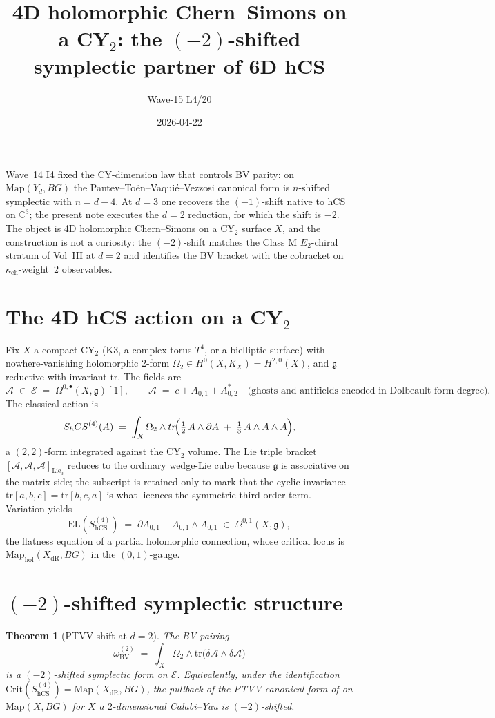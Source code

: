 \documentclass[11pt]{amsart}
\title{4D holomorphic Chern--Simons on a CY$_2$: the $(-2)$-shifted
symplectic partner of 6D hCS}
\author{Wave-15 L4/20}
\date{2026-04-22}
\providecommand{\C}{\mathbb{C}}
\providecommand{\cA}{\mathcal{A}}
\providecommand{\cE}{\mathcal{E}}
\providecommand{\dbar}{\bar{\partial}}
\providecommand{\g}{\mathfrak{g}}
\providecommand{\tr}{\mathrm{tr}}
\providecommand{\BV}{\mathrm{BV}}
\providecommand{\hCS}{\mathrm{hCS}}
\providecommand{\kappach}{\kappa_{\mathrm{ch}}}
\providecommand{\Map}{\mathrm{Map}}
\providecommand{\Crit}{\mathrm{Crit}}
\theoremstyle{plain}
\newtheorem{theorem}{Theorem}[section]
\theoremstyle{definition}
\begin{document}
\maketitle

Wave~14 I4 fixed the CY-dimension law that controls BV parity: on
$\mathrm{Map}(Y_d, BG)$ the Pantev--To\"en--Vaqui\'e--Vezzosi canonical
form is $n$-shifted symplectic with $n = d-4$. At $d=3$ one recovers
the $(-1)$-shift native to hCS on $\C^3$; the present note executes
the $d=2$ reduction, for which the shift is $-2$. The object is
4D holomorphic Chern--Simons on a CY$_2$ surface $X$, and the
construction is not a curiosity: the $(-2)$-shift matches the
Class M $E_2$-chiral stratum of Vol~III at $d=2$ and identifies the
BV bracket with the cobracket on $\kappach$-weight~$2$ observables.

\section{The 4D hCS action on a CY$_2$}

Fix $X$ a compact CY$_2$ (K3, a complex torus $T^4$, or a bielliptic
surface) with nowhere-vanishing holomorphic 2-form $\Omega_2 \in
H^0(X,K_X) = H^{2,0}(X)$, and $\g$ reductive with invariant $\tr$.
The fields are
\[
\cA \;\in\; \cE \;=\; \Omega^{0,\bullet}(X,\g)[1],\qquad
\cA \;=\; c + A_{0,1} + A^*_{0,2} \quad\text{(ghosts and antifields
encoded in Dolbeault form-degree).}
\]
The classical action is
\[
S_\hCS^{(4)}(\cA) \;=\; \int_X \Omega_2 \wedge \tr\!\Bigl(
 \tfrac12\, \cA \wedge \dbar\cA \;+\; \tfrac13\, \cA\wedge\cA\wedge\cA
\Bigr),
\]
a $(2,2)$-form integrated against the CY$_2$ volume. The Lie triple
bracket $[\cA,\cA,\cA]_{\mathrm{Lie}_3}$ reduces to the ordinary
wedge-Lie cube because $\g$ is associative on the matrix side; the
subscript is retained only to mark that the cyclic invariance
$\tr[a,b,c] = \tr[b,c,a]$ is what licences the symmetric third-order
term. Variation yields
\[
\mathrm{EL}(S_\hCS^{(4)}) \;=\; \dbar A_{0,1} + A_{0,1}\wedge A_{0,1}
\;\in\; \Omega^{0,1}(X,\g),
\]
the flatness equation of a partial holomorphic connection, whose
critical locus is $\Map_{\mathrm{hol}}(X_{\mathrm{dR}}, BG)$ in the
$(0,1)$-gauge.

\section{$(-2)$-shifted symplectic structure}

\begin{theorem}[PTVV shift at $d=2$]
\label{thm:minus2-shift}
The BV pairing
\[
\omega_\BV^{(2)} \;=\; \int_X \Omega_2 \wedge \tr\!\bigl(\delta\cA
 \wedge \delta\cA\bigr)
\]
is a $(-2)$-shifted symplectic form on $\cE$. Equivalently, under the
identification $\Crit(S_\hCS^{(4)}) = \Map(X_{\mathrm{dR}}, BG)$, the
pullback of the PTVV canonical form of \cite{PTVV2013}
on $\Map(X, BG)$ for $X$ a $2$-dimensional Calabi--Yau is
$(-2)$-shifted.
\end{theorem}
\end{document}
